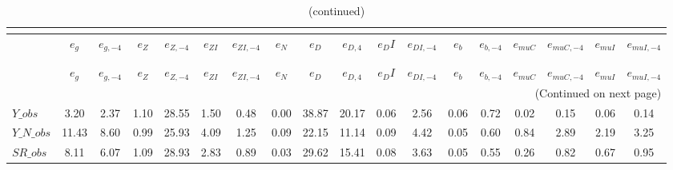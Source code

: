  
\begin{center}
\begin{longtable}{lccccccccccccccccc} 
\caption{VARIANCE DECOMPOSITION (in percent)}\\
 \label{Table:th_var_decomp_uncond}\\
\toprule 
$               $	 & 	 $           {e_g}$	 & 	 $      {e_{g,-4}}$	 & 	 $           {e_Z}$	 & 	 $      {e_{Z,-4}}$	 & 	 $        {e_{ZI}}$	 & 	 $     {e_{ZI,-4}}$	 & 	 $           {e_N}$	 & 	 $           {e_D}$	 & 	 $       {e_{D,4}}$	 & 	 $          {e_DI}$	 & 	 $     {e_{DI,-4}}$	 & 	 $           {e_b}$	 & 	 $      {e_{b,-4}}$	 & 	 $       {e_{muC}}$	 & 	 $    {e_{muC,-4}}$	 & 	 $       {e_{muI}}$	 & 	 $    {e_{muI,-4}}$\\
\midrule \endfirsthead 
\caption{(continued)}\\
 \toprule \\ 
$               $	 & 	 $           {e_g}$	 & 	 $      {e_{g,-4}}$	 & 	 $           {e_Z}$	 & 	 $      {e_{Z,-4}}$	 & 	 $        {e_{ZI}}$	 & 	 $     {e_{ZI,-4}}$	 & 	 $           {e_N}$	 & 	 $           {e_D}$	 & 	 $       {e_{D,4}}$	 & 	 $          {e_DI}$	 & 	 $     {e_{DI,-4}}$	 & 	 $           {e_b}$	 & 	 $      {e_{b,-4}}$	 & 	 $       {e_{muC}}$	 & 	 $    {e_{muC,-4}}$	 & 	 $       {e_{muI}}$	 & 	 $    {e_{muI,-4}}$\\
\midrule \endhead 
\midrule \multicolumn{18}{r}{(Continued on next page)} \\ \bottomrule \endfoot 
\bottomrule \endlastfoot 
$Y\_obs         $	 & 	            3.20	 & 	            2.37	 & 	            1.10	 & 	           28.55	 & 	            1.50	 & 	            0.48	 & 	            0.00	 & 	           38.87	 & 	           20.17	 & 	            0.06	 & 	            2.56	 & 	            0.06	 & 	            0.72	 & 	            0.02	 & 	            0.15	 & 	            0.06	 & 	            0.14 \\ 
$Y\_N\_obs      $	 & 	           11.43	 & 	            8.60	 & 	            0.99	 & 	           25.93	 & 	            4.09	 & 	            1.25	 & 	            0.09	 & 	           22.15	 & 	           11.14	 & 	            0.09	 & 	            4.42	 & 	            0.05	 & 	            0.60	 & 	            0.84	 & 	            2.89	 & 	            2.19	 & 	            3.25 \\ 
$SR\_obs        $	 & 	            8.11	 & 	            6.07	 & 	            1.09	 & 	           28.93	 & 	            2.83	 & 	            0.89	 & 	            0.03	 & 	           29.62	 & 	           15.41	 & 	            0.08	 & 	            3.63	 & 	            0.05	 & 	            0.55	 & 	            0.26	 & 	            0.82	 & 	            0.67	 & 	            0.95 \\ 

\end{longtable}
\end{center}

